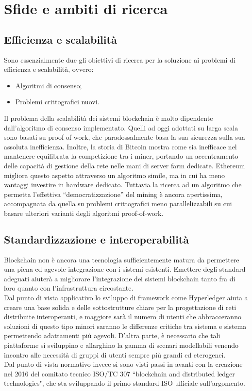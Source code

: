 \section{Sfide e ambiti di ricerca}

    \subsection{Efficienza e scalabilità}
        Sono essenzialmente due gli obiettivi di ricerca per la soluzione ai problemi di efficienza e scalabilità, ovvero:
        \begin{itemize}
            \item Algoritmi di consenso;
            \item Problemi crittografici nuovi.
        \end{itemize}
        Il problema della scalabilità dei sistemi blockchain è molto dipendente dall'algoritmo di consenso implementato. Quelli ad oggi adottati su larga scala sono basati su proof-of-work, che paradossalmente basa la sua sicurezza sulla sua assoluta inefficienza. Inoltre, la storia di Bitcoin mostra come sia inefficace nel mantenere equilibrata la competizione tra i miner, portando un accentramento delle capacità di gestione della rete nelle mani di server farm dedicate. Ethereum migliora questo aspetto attraverso un algoritmo simile, ma in cui ha meno vantaggi investire in hardware dedicato. Tuttavia la ricerca ad un algoritmo che permetta l'effettiva ``democratizzazione'' del mining è ancora apertissima, accompagnata da quella su problemi crittografici meno parallelizzabili su cui basare ulteriori varianti degli algoritmi proof-of-work.
        
    \subsection{Standardizzazione e interoperabilità}
        Blockchain non è ancora una tecnologia sufficientemente matura da permettere una piena ed agevole integrazione con i sistemi esistenti. Emettere degli standard adeguati aiuterà a migliorare l'integrazione dei sistemi blockchain tanto fra di loro quanto con l'infrastruttura circostante. \\
        Dal punto di vista applicativo lo sviluppo di framework come Hyperledger aiuta a creare una base solida e delle sottostrutture chiare per la progettazione di reti distribuite interoperanti, e maggiore sarà il numero di utenti che abbracceranno soluzioni di questo tipo minori saranno le differenze critiche tra sistema e sistema permettendo adattamenti più agevoli. D'altra parte, è necessario che tali piattaforme si sviluppino e allarghino la gamma di scenari modellabili venendo incontro alle necessità di gruppi di utenti sempre più grandi ed eterogenei. \\
        Dal punto di vista normativo invece si sono visti passi in avanti con la creazione nel 2016 del comitato tecnico ISO/TC 307 ``blockchain and distributed ledger technologies", che sta sviluppando il primo standard ISO ufficiale sull'argomento.

